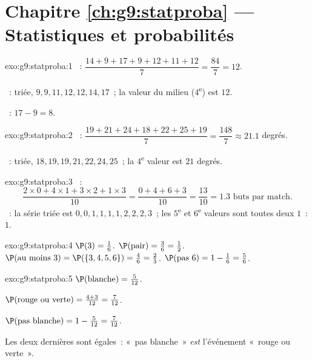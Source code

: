 \section*{Chapitre \ref{ch:g9:statproba} --- Statistiques et probabilités}

\begin{solution}{exo:g9:statproba:1}
~: $\dfrac{14 + 9 + 17 + 9 + 12 + 11 + 12}{7} = \dfrac{84}{7} = 12$.

~: triée, $9, 9, 11, 12, 12, 14, 17$~; la valeur du milieu
($4$\textsuperscript{e}) est $12$.

~: $17 - 9 = 8$.
\end{solution}

\begin{solution}{exo:g9:statproba:2}
~: $\dfrac{19 + 21 + 24 + 18 + 22 + 25 + 19}{7} = \dfrac{148}{7}
\approx 21.1$ degrés.

~: triée, $18, 19, 19, 21, 22, 24, 25$~; la $4$\textsuperscript{e} valeur est
$21$ degrés.
\end{solution}

\begin{solution}{exo:g9:statproba:3}
~:
\[
\frac{2 \times 0 + 4 \times 1 + 3 \times 2 + 1 \times 3}{10}
= \frac{0 + 4 + 6 + 3}{10} = \frac{13}{10} = 1.3
\text{ buts par match.}
\]
~: la série triée est $0,0,1,1,1,1,2,2,2,3$~; les $5$\textsuperscript{e} et
$6$\textsuperscript{e} valeurs sont toutes deux $1$~:  $1$.
\end{solution}

\begin{solution}{exo:g9:statproba:4}
$\P(3) = \frac16$. \quad
$\P(\text{pair}) = \frac36 = \frac12$. \quad
$\P(\text{au moins } 3) = \P(\{3,4,5,6\}) = \frac46 = \frac23$. \quad
$\P(\text{pas } 6) = 1 - \frac16 = \frac56$.
\end{solution}

\begin{solution}{exo:g9:statproba:5}
$\P(\text{blanche}) = \frac{5}{12}$.

$\P(\text{rouge ou verte}) = \frac{4 + 3}{12} = \frac{7}{12}$.

$\P(\text{pas blanche}) = 1 - \frac{5}{12} = \frac{7}{12}$.

Les deux dernières sont égales~: «~pas blanche~» \emph{est} l'événement
«~rouge ou verte~».
\end{solution}

